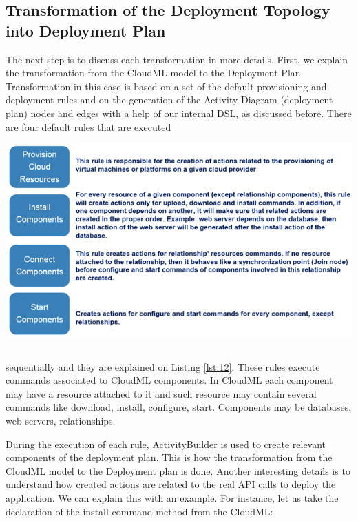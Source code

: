 
\subsection{Transformation of the Deployment Topology into Deployment Plan} 

\noindent The next step is to discuss each transformation in more details. First, we explain the transformation from the CloudML model to the Deployment Plan. Transformation in this case is based on a set of the default provisioning and deployment rules and on the generation of the Activity Diagram (deployment plan) nodes and edges with a help of our internal DSL, as discussed before. There are four default rules that are executed 

\begin{center}
	\includegraphics[width=38em]{./Figures/Rules}
	\begin{lstlisting}[mathescape,caption={Default rules of the CloudML deployment engine},label={lst:12}]
	\end{lstlisting}
\end{center}  

\noindent sequentially and they are explained on Listing \ref{lst:12}. These rules execute commands associated to CloudML components. In CloudML each component may have a resource attached to it and such resource may contain several commands like download, install, configure, start. Components may be databases, web servers, relationships.

\noindent During the execution of each rule, ActivityBuilder is used to create relevant components of the deployment plan. This is how the transformation from the CloudML model to the Deployment plan is done. Another interesting details is to understand how created actions are related to the real API calls to deploy the application. We can explain this with an example. For instance, let us take the declaration of the install command method from the CloudML:

